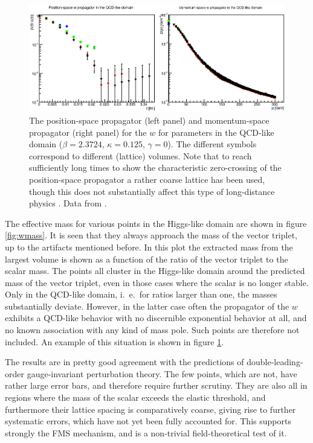 \documentclass[final,12pt]{article}
\newcommand*{\1}{1\!\!\!\bot}
\begin{document}
\begin{figure}
\includegraphics[width=\linewidth]{w-qcd}
\caption{\label{fig:w-qcd}The position-space propagator (left panel) and momentum-space propagator (right panel) for the $w$ for parameters in the QCD-like domain ($\beta=2.3724$, $\kappa=0.125$, $\gamma=0$). The different symbols correspond to different (lattice) volumes. Note that to reach sufficiently long times to show the characteristic zero-crossing of the position-space propagator a rather coarse lattice has been used, though this does not substantially affect this type of long-distance physics \cite{Maas:2011se}. Data from \cite{Maas:unpublished}.}
\end{figure}

The effective mass for various points in the Higgs-like domain are shown in figure \ref{fig:wmass}. It is seen that they always approach the mass of the vector triplet, up to the artifacts mentioned before. In this plot the extracted mass from the largest volume is shown as a function of the ratio of the vector triplet to the scalar mass. The points all cluster in the Higgs-like domain around the predicted mass of the vector triplet, even in those cases where the scalar is no longer stable. Only in the QCD-like domain, i.\ e.\ for ratios larger than one, the masses substantially deviate. However, in the latter case often the propagator of the $w$ exhibits a QCD-like behavior \cite{Maas:2011se} with no discernible exponential behavior at all, and no known association with any kind of mass pole. Such points are therefore not included. An example of this situation is shown in figure \ref{fig:w-qcd}.

The results are in pretty good agreement with the predictions of double-leading-order gauge-invariant perturbation theory. The few points, which are not, have rather large error bars, and therefore require further scrutiny. They are also all in regions where the mass of the scalar exceeds the elastic threshold, and furthermore their lattice spacing is comparatively coarse, giving rise to further systematic errors, which have not yet been fully accounted for. This supports strongly the FMS mechanism, and is a non-trivial field-theoretical test of it.
\end{document}
